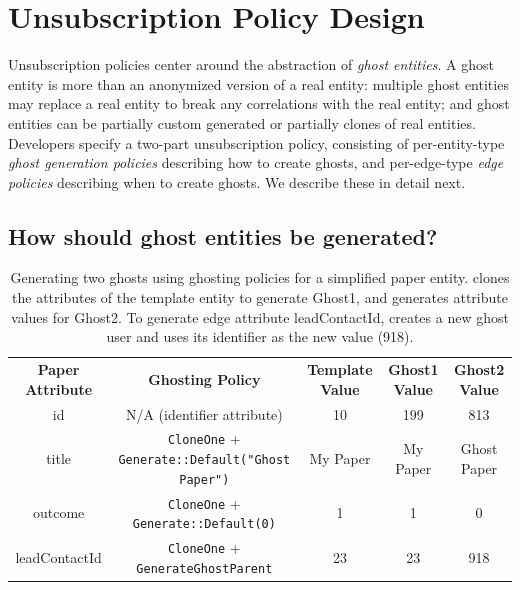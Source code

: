 \section{Unsubscription Policy Design}
\label{sec:design:unsub}
Unsubscription policies center around the abstraction of \emph{ghost entities}. A ghost entity is
more than an anonymized version of a real entity: multiple ghost
entities may replace a real entity to break any correlations with the real entity; and ghost entities can be
partially custom generated or partially clones of real entities.
Developers specify a two-part unsubscription policy, consisting of per-entity-type \emph{ghost
generation policies} describing how to create ghosts, and per-edge-type \emph{edge policies}
describing when to create ghosts. We describe these in detail next.

\subsection{How should ghost entities be generated?}
\label{sec:ghosting}

\begin{table}[t!]
    \centering
    \footnotesize
\begin{tabular}{@{}ccccc@{}}
\textbf{Paper Attribute} & \textbf{Ghosting Policy} & \textbf{Template Value} & \textbf{Ghost1 Value} & \textbf{Ghost2 Value} 
  \\ \cmidrule(r){1-5}
    {id} & N/A (identifier attribute) & 10 & 199 & 813 \\
{title} & \texttt{CloneOne} + \texttt{Generate::Default("Ghost Paper")} & My Paper & My
    Paper & Ghost Paper \\
{outcome} & \texttt{CloneOne} + \texttt{Generate::Default(0)} & 1 & 1 & 0 \\
{leadContactId} & \texttt{CloneOne} + \texttt{GenerateGhostParent} & 23 & 23 & 918 \\
\end{tabular}
    \caption{Generating two ghosts using ghosting policies for a simplified paper entity.
    \sys clones the attributes of the template entity to generate Ghost1, and generates
    attribute values for Ghost2. To generate edge attribute leadContactId, \sys creates a new ghost user and uses its identifier as the new value (918).}
    \label{tab:ghosting}
\end{table}

